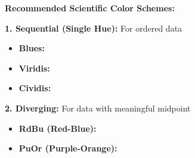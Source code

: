 \documentclass[11pt,a4paper]{article}
\begin{document}
\begin{tcolorbox}[colback=blue!5,colframe=blue!50,title={\faPalette~Professional Color Palettes}]
\textbf{Recommended Scientific Color Schemes:}

\textbf{1. Sequential (Single Hue):} For ordered data

\begin{itemize}
    \item \textbf{Blues:} 
    \colorbox[HTML]{f7fbff}{\phantom{XX}}
    \colorbox[HTML]{deebf7}{\phantom{XX}}
    \colorbox[HTML]{c6dbef}{\phantom{XX}}
    \colorbox[HTML]{9ecae1}{\phantom{XX}}
    \colorbox[HTML]{6baed6}{\phantom{XX}}
    \colorbox[HTML]{4292c6}{\phantom{XX}}
    \colorbox[HTML]{2171b5}{\phantom{XX}}
    \colorbox[HTML]{08519c}{\phantom{XX}}
    \colorbox[HTML]{08306b}{\phantom{XX}}
    
    \item \textbf{Viridis:} 
    \colorbox[HTML]{440154}{\phantom{XX}}
    \colorbox[HTML]{482777}{\phantom{XX}}
    \colorbox[HTML]{3f4a8a}{\phantom{XX}}
    \colorbox[HTML]{31678e}{\phantom{XX}}
    \colorbox[HTML]{26838f}{\phantom{XX}}
    \colorbox[HTML]{1f9d8a}{\phantom{XX}}
    \colorbox[HTML]{6cce5a}{\phantom{XX}}
    \colorbox[HTML]{b6de2b}{\phantom{XX}}
    \colorbox[HTML]{fde725}{\phantom{XX}}
    
    \item \textbf{Cividis:} 
    \colorbox[HTML]{00204d}{\phantom{XX}}
    \colorbox[HTML]{00336f}{\phantom{XX}}
    \colorbox[HTML]{39486a}{\phantom{XX}}
    \colorbox[HTML]{575c6d}{\phantom{XX}}
    \colorbox[HTML]{707173}{\phantom{XX}}
    \colorbox[HTML]{8a8779}{\phantom{XX}}
    \colorbox[HTML]{a69d75}{\phantom{XX}}
    \colorbox[HTML]{c4b56c}{\phantom{XX}}
    \colorbox[HTML]{e4cf5b}{\phantom{XX}}
    \colorbox[HTML]{ffe945}{\phantom{XX}}
\end{itemize}

\textbf{2. Diverging:} For data with meaningful midpoint

\begin{itemize}
    \item \textbf{RdBu (Red-Blue):} 
    \colorbox[HTML]{b2182b}{\phantom{XX}}
    \colorbox[HTML]{d6604d}{\phantom{XX}}
    \colorbox[HTML]{f4a582}{\phantom{XX}}
    \colorbox[HTML]{fddbc7}{\phantom{XX}}
    \colorbox[HTML]{f7f7f7}{\phantom{XX}}
    \colorbox[HTML]{d1e5f0}{\phantom{XX}}
    \colorbox[HTML]{92c5de}{\phantom{XX}}
    \colorbox[HTML]{4393c3}{\phantom{XX}}
    \colorbox[HTML]{2166ac}{\phantom{XX}}
    
    \item \textbf{PuOr (Purple-Orange):} 
    \colorbox[HTML]{762a83}{\phantom{XX}}
    \colorbox[HTML]{9970ab}{\phantom{XX}}
    \colorbox[HTML]{c2a5cf}{\phantom{XX}}
    \colorbox[HTML]{e7d4e8}{\phantom{XX}}
    \colorbox[HTML]{f7f7f7}{\phantom{XX}}
    \colorbox[HTML]{fdb863}{\phantom{XX}}
    \colorbox[HTML]{e08214}{\phantom{XX}}
    \colorbox[HTML]{b35806}{\phantom{XX}}
    \colorbox[HTML]{7f3b08}{\phantom{XX}}
    

\end{itemize}
\end{tcolorbox}
\end{document}
